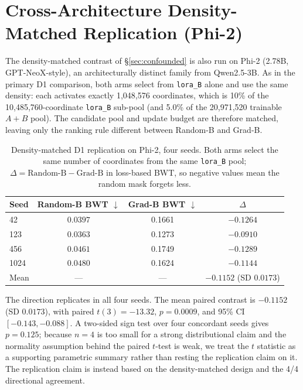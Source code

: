 \section{Cross-Architecture Density-Matched Replication (Phi-2)}
\label{app:phi2_d1}

The density-matched contrast of \S\ref{sec:confounded} is also run on Phi-2 (2.78B, GPT-NeoX-style), an architecturally distinct family from Qwen2.5-3B. As in the primary D1 comparison, both arms select from \texttt{lora\_B} alone and use the same density: each activates exactly 1{,}048{,}576 coordinates, which is 10\% of the 10{,}485{,}760-coordinate \texttt{lora\_B} sub-pool (and 5.0\% of the 20{,}971{,}520 trainable $A{+}B$ pool). The candidate pool and update budget are therefore matched, leaving only the ranking rule different between Random-B and Grad-B.

\begin{table}[t]
\caption{Density-matched D1 replication on Phi-2, four seeds. Both arms select the same number of coordinates from the same \texttt{lora\_B} pool; $\Delta=\text{Random-B}-\text{Grad-B}$ in loss-based BWT, so negative values mean the random mask forgets less.}
\label{tab:phi2_d1}
\centering
\small
\begin{tabular}{@{}lccc@{}}
\toprule
\textbf{Seed} & \textbf{Random-B BWT $\downarrow$} & \textbf{Grad-B BWT $\downarrow$} & \textbf{$\Delta$} \\
\midrule
42   & $\mathbf{0.0397}$ & 0.1661 & $-0.1264$ \\
123  & $\mathbf{0.0363}$ & 0.1273 & $-0.0910$ \\
456  & $\mathbf{0.0461}$ & 0.1749 & $-0.1289$ \\
1024 & $\mathbf{0.0480}$ & 0.1624 & $-0.1144$ \\
\midrule
Mean & --- & --- & $-0.1152$ (SD $0.0173$) \\
\bottomrule
\end{tabular}
\end{table}

The direction replicates in all four seeds. The mean paired contrast is $-0.1152$ (SD $0.0173$), with paired $t(3)=-13.32$, $p=0.0009$, and 95\% CI $[-0.143,-0.088]$. A two-sided sign test over four concordant seeds gives $p=0.125$; because $n=4$ is too small for a strong distributional claim and the normality assumption behind the paired $t$-test is weak, we treat the $t$ statistic as a supporting parametric summary rather than resting the replication claim on it. The replication claim is instead based on the density-matched design and the 4/4 directional agreement.

